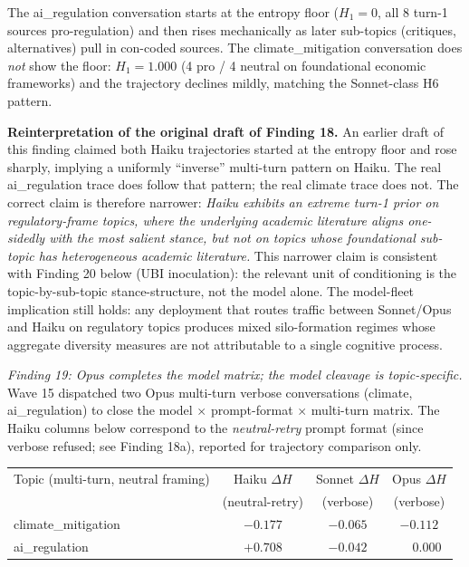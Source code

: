 \documentclass[12pt,a4paper]{article}
\begin{document}
The ai\_regulation conversation starts at the entropy floor ($H_1 = 0$, all 8 turn-1 sources pro-regulation) and then rises mechanically as later sub-topics (critiques, alternatives) pull in con-coded sources.
The climate\_mitigation conversation does \emph{not} show the floor: $H_1 = 1.000$ (4 pro / 4 neutral on foundational economic frameworks) and the trajectory declines mildly, matching the Sonnet-class H6 pattern.

\textbf{Reinterpretation of the original draft of Finding 18.} An earlier draft of this finding claimed both Haiku trajectories started at the entropy floor and rose sharply, implying a uniformly ``inverse'' multi-turn pattern on Haiku.
The real ai\_regulation trace does follow that pattern; the real climate trace does not.
The correct claim is therefore narrower: \emph{Haiku exhibits an extreme turn-1 prior on regulatory-frame topics, where the underlying academic literature aligns one-sidedly with the most salient stance, but not on topics whose foundational sub-topic has heterogeneous academic literature.}
This narrower claim is consistent with Finding 20 below (UBI inoculation): the relevant unit of conditioning is the topic-by-sub-topic stance-structure, not the model alone.
The model-fleet implication still holds: any deployment that routes traffic between Sonnet/Opus and Haiku on regulatory topics produces mixed silo-formation regimes whose aggregate diversity measures are not attributable to a single cognitive process.

\emph{Finding 19: Opus completes the model matrix; the model cleavage is topic-specific.}
Wave 15 dispatched two Opus multi-turn verbose conversations (climate, ai\_regulation) to close the model $\times$ prompt-format $\times$ multi-turn matrix.
The Haiku columns below correspond to the \emph{neutral-retry} prompt format (since verbose refused; see Finding 18a), reported for trajectory comparison only.

\begin{center}
\begin{tabular}{lccc}
\toprule
Topic (multi-turn, neutral framing) & Haiku $\Delta H$ & Sonnet $\Delta H$ & Opus $\Delta H$ \\
 & (neutral-retry) & (verbose) & (verbose) \\
\midrule
climate\_mitigation & $-0.177$ & $-0.065$ & $-0.112$ \\
ai\_regulation & $+0.708$ & $-0.042$ & $\phantom{-}0.000$ \\
\bottomrule
\end{tabular}
\end{center}
\end{document}
